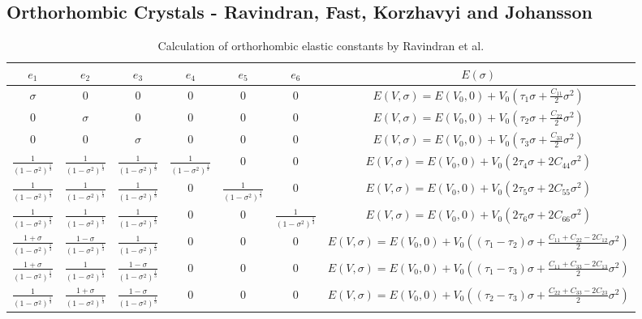 \subsection{Orthorhombic Crystals - Ravindran, Fast, Korzhavyi and Johansson}

\renewcommand{\arraystretch}{1.7}
\begin{table}[!htbp]
\centering
\begin{tabular}{c c c c c c c}
\hline\hline
$e_1$ & $e_2$ & $e_3$ & $e_4$ & $e_5$ & $e_6$ & $E(\sigma)$ \\
\hline\hline
$\sigma$ & 0 & 0 & 0 & 0 & 0 &  $E(V,\sigma) = E(V_0, 0) + V_0 \left( \tau_1 \sigma + \frac{C_{11}}{2} \sigma^2 \right) $ \\
0 & $\sigma$ & 0 & 0 & 0 & 0 &  $E(V,\sigma) = E(V_0, 0) + V_0 \left( \tau_2 \sigma + \frac{C_{22}}{2} \sigma^2 \right) $ \\
0 & 0 & $\sigma$ & 0 & 0 & 0 &  $E(V,\sigma) = E(V_0, 0) + V_0 \left( \tau_3 \sigma + \frac{C_{33}}{2} \sigma^2 \right) $ \\
$\frac{1}{(1-\sigma^2)^{\frac{1}{3}}}$ & $\frac{1}{(1-\sigma^2)^{\frac{1}{3}}}$ & $\frac{1}{(1-\sigma^2)^{\frac{1}{3}}}$ & $\frac{1}{(1-\sigma^2)^{\frac{1}{3}}}$ & 0 & 0 &  $E(V,\sigma) = E(V_0, 0) + V_0 \left(2 \tau_4 \sigma + 2 C_{44} \sigma^2 \right) $ \\
$\frac{1}{(1-\sigma^2)^{\frac{1}{3}}}$ & $\frac{1}{(1-\sigma^2)^{\frac{1}{3}}}$ & $\frac{1}{(1-\sigma^2)^{\frac{1}{3}}}$ & 0 & $\frac{1}{(1-\sigma^2)^{\frac{1}{3}}}$ & 0 &  $E(V,\sigma) = E(V_0, 0) + V_0 \left(2 \tau_5 \sigma + 2 C_{55} \sigma^2 \right) $ \\
$\frac{1}{(1-\sigma^2)^{\frac{1}{3}}}$ & $\frac{1}{(1-\sigma^2)^{\frac{1}{3}}}$ & $\frac{1}{(1-\sigma^2)^{\frac{1}{3}}}$ & 0 & 0 & $\frac{1}{(1-\sigma^2)^{\frac{1}{3}}}$ &  $E(V,\sigma) = E(V_0, 0) + V_0 \left(2 \tau_6 \sigma + 2 C_{66} \sigma^2 \right) $ \\
$\frac{1+\sigma}{(1 - \sigma^2)^{\frac{1}{3}}}$ & $\frac{1-\sigma}{(1 - \sigma^2)^{\frac{1}{3}}}$ & $\frac{1}{(1 - \sigma^2)^{\frac{1}{3}}}$ & 0 & 0 & 0 &  $E(V,\sigma) = E(V_0, 0) + V_0 \left( (\tau_1 - \tau_2) \sigma + \frac{C_{11} + C_{22} - 2 C_{12} }{2} \sigma^2 \right) $ \\
$\frac{1+\sigma}{(1 - \sigma^2)^{\frac{1}{3}}}$ & $\frac{1}{(1 - \sigma^2)^{\frac{1}{3}}}$ & $\frac{1-\sigma}{(1 - \sigma^2)^{\frac{1}{3}}}$ & 0 & 0 & 0 &  $E(V,\sigma) = E(V_0, 0) + V_0 \left( (\tau_1 - \tau_3) \sigma + \frac{C_{11} + C_{33} - 2 C_{13} }{2} \sigma^2 \right) $ \\
$\frac{1}{(1 - \sigma^2)^{\frac{1}{3}}}$ & $\frac{1+\sigma}{(1 - \sigma^2)^{\frac{1}{3}}}$ & $\frac{1-\sigma}{(1 - \sigma^2)^{\frac{1}{3}}}$ & 0 & 0 & 0 &  $E(V,\sigma) = E(V_0, 0) + V_0 \left( (\tau_2 - \tau_3) \sigma + \frac{C_{22} + C_{33} - 2 C_{23} }{2} \sigma^2 \right) $ \\
\end{tabular}
\label{tab:multicol}
\caption{Calculation of orthorhombic elastic constants by Ravindran et al.\cite{dfttisiravindran}}
\end{table}


